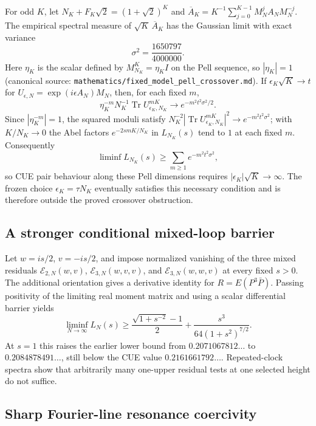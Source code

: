 For odd \(K\), let
\(N_K+F_K\sqrt2=(1+\sqrt2)^K\) and
\(\overline A_K=K^{-1}\sum_{j=0}^{K-1}M_N^jA_NM_N^{-j}\).
The empirical spectral measure of \(\sqrt K\,\overline A_K\) has the Gaussian
limit with exact variance
\[
 \sigma^2=\frac{1650797}{4000000}.
\]
Here \(\eta_K\) is the scalar defined by \(M_{N_K}^K=\eta_KI\) on the
Pell sequence, so \(|\eta_K|=1\) (canonical source:
\texttt{mathematics/fixed\_model\_pell\_crossover.md}).
If \(\epsilon_K\sqrt K\to t\) for
\(U_{\epsilon,N}=\exp(i\epsilon A_N)M_N\), then, for each fixed \(m\),
\[
 \eta_K^{-m}N_K^{-1}\operatorname{Tr}U_{\epsilon_K,N_K}^{mK}
 \longrightarrow e^{-m^2t^2\sigma^2/2}.
\]
Since \(|\eta_K^{-m}|=1\), the squared moduli satisfy
\(N_K^{-2}|\operatorname{Tr}U_{\epsilon_K,N_K}^{mK}|^2
\to e^{-m^2t^2\sigma^2}\); with \(K/N_K\to0\) the Abel factors
\(e^{-2smK/N_K}\) in \(L_{N_K}(s)\) tend to \(1\) at each fixed \(m\).
Consequently
\[
 \liminf L_{N_K}(s)\ge\sum_{m\ge1}e^{-m^2t^2\sigma^2},
\]
so CUE pair behaviour along these Pell dimensions requires
\(|\epsilon_K|\sqrt K\to\infty\).  The frozen choice
\(\epsilon_K=\tau N_K\) eventually satisfies this necessary condition and is
therefore outside the proved crossover obstruction.

\subsection{A stronger conditional mixed-loop barrier}

Let \(w=is/2\), \(v=-is/2\), and impose normalized vanishing of the three
mixed residuals
\(\mathcal E_{2,N}(w,v)\),
\(\mathcal E_{3,N}(w,v,v)\), and
\(\mathcal E_{3,N}(w,w,v)\) at every fixed \(s>0\).
The additional orientation gives a derivative identity for
\(R=E(P^3\bar P)\).  Passing positivity of the limiting real moment matrix
and using a scalar differential barrier yields
\[
 \liminf_{N\to\infty}L_N(s)\ge
 \frac{\sqrt{1+s^{-2}}-1}{2}
 +\frac{s^3}{64(1+s^2)^{7/2}}.
\]
At \(s=1\) this raises the earlier lower bound from
\(0.2071067812\ldots\) to \(0.2084878491\ldots\), still below the CUE value
\(0.2161661792\ldots\).  Repeated-clock spectra show that arbitrarily many
one-upper residual tests at one selected height do not suffice.

\subsection{Sharp Fourier-line resonance coercivity}

